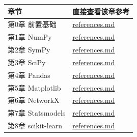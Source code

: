 {\def\LTcaptype{none} %
\begin{longtable}[]{@{}
  >{\raggedright\arraybackslash}p{}
  >{\raggedright\arraybackslash}p{}@{}}
\toprule\noalign{}
\begin{minipage}[b]{\linewidth}\raggedright
章节
\end{minipage} & \begin{minipage}[b]{\linewidth}\raggedright
直接查看该章参考
\end{minipage} \\
\midrule\noalign{}
\endhead
\bottomrule\noalign{}
\endlastfoot
第0章 前置基础 &
\href{../../chapters/00-prep/references.md}{references.md} \\
第1章 NumPy &
\href{../../chapters/01-numpy/references.md}{references.md} \\
第2章 SymPy &
\href{../../chapters/02-sympy/references.md}{references.md} \\
第3章 SciPy &
\href{../../chapters/03-scipy/references.md}{references.md} \\
第4章 Pandas &
\href{../../chapters/04-pandas/references.md}{references.md} \\
第5章 Matplotlib &
\href{../../chapters/05-matplotlib/references.md}{references.md} \\
第6章 NetworkX &
\href{../../chapters/06-networkx/references.md}{references.md} \\
第7章 Statsmodels &
\href{../../chapters/07-statsmodels/references.md}{references.md} \\
第8章 scikit-learn &
\href{../../chapters/08-sklearn/references.md}{references.md} \\
\end{longtable}
}

\backmatter
